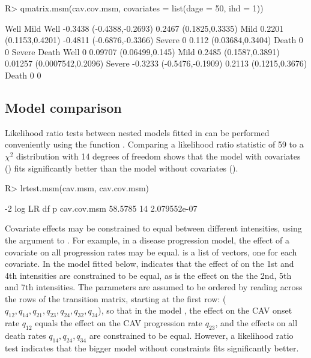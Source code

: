 \documentclass[article,shortnames]{jss}
\begin{document}
\begin{CodeChunk}
\begin{CodeInput}
R> qmatrix.msm(cav.cov.msm, covariates = list(dage = 50, ihd = 1))
\end{CodeInput}
\begin{CodeOutput}
       Well                      Mild
Well   -0.3438 (-0.4388,-0.2693) 0.2467 (0.1825,0.3335)
Mild   0.2201 (0.1153,0.4201)    -0.4811 (-0.6876,-0.3366)
Severe 0                         0.112 (0.03684,0.3404)
Death  0                         0
       Severe                    Death
Well   0                         0.09707 (0.06499,0.145)
Mild   0.2485 (0.1587,0.3891)    0.01257 (0.0007542,0.2096)
Severe -0.3233 (-0.5476,-0.1909) 0.2113 (0.1215,0.3676)
Death  0                         0
\end{CodeOutput}
\end{CodeChunk}

\subsection{Model comparison}

Likelihood ratio tests between nested models fitted in  can
be performed conveniently using the function .
Comparing a likelihood ratio statistic of 59 to a $\chi^2$
distribution with 14 degrees of freedom shows that the model with
covariates () fits significantly better than the
model without covariates ().

\begin{CodeChunk}
\begin{CodeInput}
R> lrtest.msm(cav.msm, cav.cov.msm)
\end{CodeInput}
\begin{CodeOutput}
            -2 log LR df            p
cav.cov.msm  58.5785 14 2.079552e-07
\end{CodeOutput}
\end{CodeChunk}

Covariate effects may be constrained to equal between different
intensities, using the  argument to .
For example, in a disease progression model, the effect of a covariate
on all progression rates may be equal.   is a list of
vectors, one for each covariate. In the model 
fitted below,  indicates that the effect
of  on the 1st and 4th intensities are constrained to be
equal, as is the effect on the the 2nd, 5th and 7th intensities.  The
parameters are assumed to be ordered by reading across the rows of the
transition matrix, starting at the first row: ($q_{12}, q_{14},
q_{21}, q_{23}, q_{24}, q_{32}, q_{34}$), so that in the model
, the effect on the CAV onset rate $q_{12}$ equals
the effect on the CAV progression rate $q_{23}$, and the effects on
all death rates $q_{14},q_{24},q_{34}$ are constrained to be equal.
However, a likelihood ratio test indicates that the bigger model
 without constraints fits significantly better.
\end{document}
